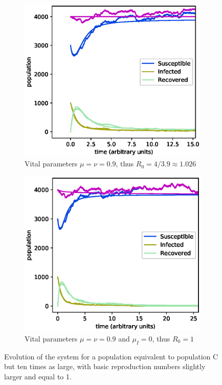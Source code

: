 \documentclass[a4paper,10pt,twocolumn]{article}
\begin{document}
\begin{figure}
	\centering
	\begin{subfigure}{0.5\linewidth}
		\centering
		\includegraphics[width=\linewidth]{a4b3c05e09d09_x10_1.eps}
		\caption{Vital parameters $\mu=\nu=0.9$, thus $R_0=4/3.9\approx1.026$}
		\label{fig:cstay}
	\end{subfigure}%
	\begin{subfigure}{0.5\linewidth}
		\centering
		\includegraphics[width=\linewidth]{a4b3c05e09d09dI01_x10_1.eps}
		\caption{Vital parameters $\mu=\nu=0.9$ and $\mu_I=0$, thus $R_0=1$}
		\label{fig:cstay}
	\end{subfigure}
	\caption{Evolution of the system for a population equivalent to population C but ten times as large, with basic reproduction numbers slightly larger and equal to 1.}
	\label{fig:c}
\end{figure}
\end{document}
